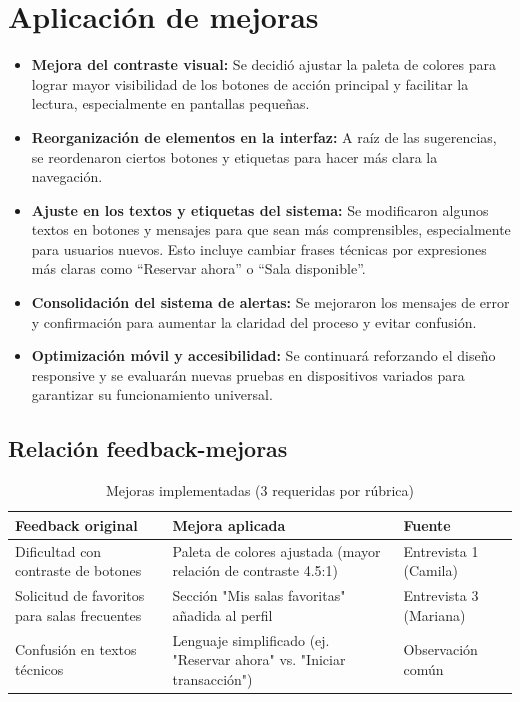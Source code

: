 \documentclass{article}
\begin{document}
\section{Aplicación de mejoras}

\begin{itemize}
  \item \textbf{Mejora del contraste visual:} Se decidió ajustar la paleta de colores para lograr mayor visibilidad de los botones de acción principal y facilitar la lectura, especialmente en pantallas pequeñas.

  \item \textbf{Reorganización de elementos en la interfaz:} A raíz de las sugerencias, se reordenaron ciertos botones y etiquetas para hacer más clara la navegación.

  \item \textbf{Ajuste en los textos y etiquetas del sistema:} Se modificaron algunos textos en botones y mensajes para que sean más comprensibles, especialmente para usuarios nuevos. Esto incluye cambiar frases técnicas por expresiones más claras como “Reservar ahora” o “Sala disponible”.

  \item \textbf{Consolidación del sistema de alertas:} Se mejoraron los mensajes de error y confirmación para aumentar la claridad del proceso y evitar confusión.

  \item \textbf{Optimización móvil y accesibilidad:} Se continuará reforzando el diseño responsive y se evaluarán nuevas pruebas en dispositivos variados para garantizar su funcionamiento universal.

\end{itemize}

\subsection{Relación feedback-mejoras}
\begin{table}[h]
\centering
\caption{Mejoras implementadas (3 requeridas por rúbrica)}
\begin{tabular}{|p{5cm}|p{5cm}|p{3cm}|}
\hline
\textbf{Feedback original} & \textbf{Mejora aplicada} & \textbf{Fuente} \\ \hline
Dificultad con contraste de botones & Paleta de colores ajustada (mayor relación de contraste 4.5:1) & Entrevista 1 (Camila) \\ \hline
Solicitud de favoritos para salas frecuentes & Sección "Mis salas favoritas" añadida al perfil & Entrevista 3 (Mariana) \\ \hline
Confusión en textos técnicos & Lenguaje simplificado (ej. "Reservar ahora" vs. "Iniciar transacción") & Observación común \\ \hline
\end{tabular}
\label{tab:mejoras}
\end{table}
\end{document}
